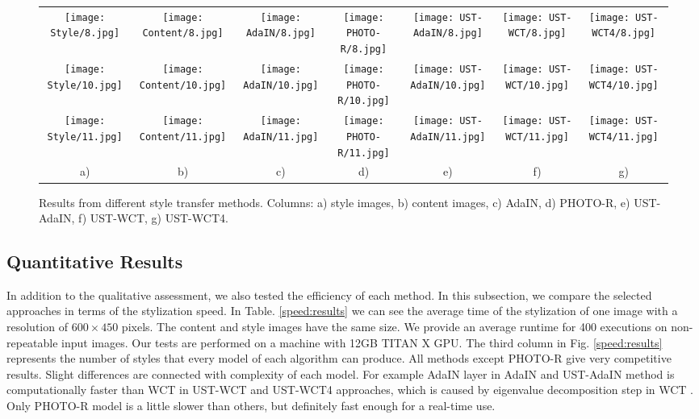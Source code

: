 \documentclass{llncs}
\begin{document}
\begin{figure}[!ht]
\begin{tabular}{ccccccc}
\texttt{[image: Style/8.jpg]}&
\texttt{[image: Content/8.jpg]}&
\texttt{[image: AdaIN/8.jpg]}&
\texttt{[image: PHOTO-R/8.jpg]}&
\texttt{[image: UST-AdaIN/8.jpg]}&
\texttt{[image: UST-WCT/8.jpg]}&
\texttt{[image: UST-WCT4/8.jpg]}\\


\texttt{[image: Style/10.jpg]}&
\texttt{[image: Content/10.jpg]}&
\texttt{[image: AdaIN/10.jpg]}&
\texttt{[image: PHOTO-R/10.jpg]}&
\texttt{[image: UST-AdaIN/10.jpg]}&
\texttt{[image: UST-WCT/10.jpg]}&
\texttt{[image: UST-WCT4/10.jpg]}\\

\texttt{[image: Style/11.jpg]}&
\texttt{[image: Content/11.jpg]}&
\texttt{[image: AdaIN/11.jpg]}&
\texttt{[image: PHOTO-R/11.jpg]}&
\texttt{[image: UST-AdaIN/11.jpg]}&
\texttt{[image: UST-WCT/11.jpg]}&
\texttt{[image: UST-WCT4/11.jpg]}\\
a)&b)&c)&d)&e)&f)&g)\\
\end{tabular}
    \caption{Results from different style transfer methods. Columns: a) style images, b) content images, c) AdaIN, d) PHOTO-R, e) UST-AdaIN, f) UST-WCT, g) UST-WCT4. \label{visual:results}}
\end{figure}
\subsection{Quantitative Results}

In addition to the qualitative assessment, we also tested the efficiency of each method. In this subsection, we compare the selected approaches in terms of the stylization speed. In Table. \ref{speed:results} we can see the average time of the stylization of one image with a resolution of $600 \times 450$ pixels. The content and style images have the same size. We provide an average runtime for 400 executions on non-repeatable input images. Our tests are performed on a machine with 12GB TITAN X GPU. The third column in Fig. \ref{speed:results} represents the number of styles that every model of each algorithm can produce. All methods except PHOTO-R give very competitive results. Slight differences are connected with complexity of each model. For example AdaIN layer in AdaIN and UST-AdaIN method is computationally faster than WCT in UST-WCT and UST-WCT4 approaches, which is caused by eigenvalue decomposition step in WCT \cite{universal:style}. Only PHOTO-R model is a little slower than others, but definitely fast enough for a real-time use.
\end{document}
